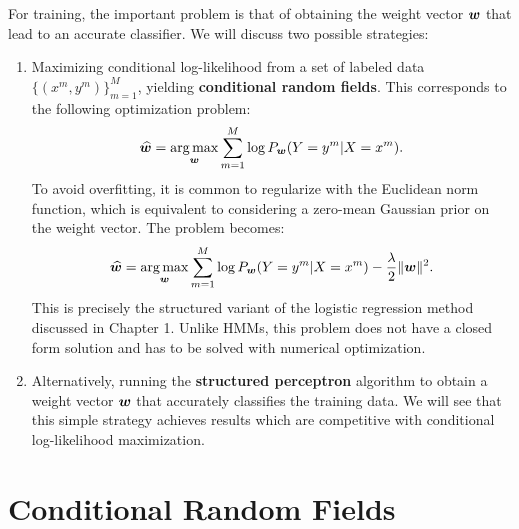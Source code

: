 For training, 
the important problem is that of obtaining the weight vector $\boldsymbol{w}$ that lead to an accurate 
classifier. 
We will discuss two possible strategies:
\begin{enumerate}
\item Maximizing conditional log-likelihood from a set of labeled data $\{(x^m,y^m)\}_{m=1}^M$, yielding \textbf{conditional random fields}. This corresponds to the following optimization problem:
\begin{equation}
\widehat{\boldsymbol{w}} = \operatorname*{arg\,max}_{\boldsymbol{w}} \sum_{m=1}^M \log P_{\boldsymbol{w}}(Y=y^m | X=x^m).
\end{equation}
To avoid overfitting, it is common to regularize with the Euclidean norm function, 
which is equivalent to considering a zero-mean Gaussian prior on the weight vector.
The problem becomes:
\begin{equation}
\widehat{\boldsymbol{w}} = \operatorname*{arg\,max}_{\boldsymbol{w}} \sum_{m=1}^M \log P_{\boldsymbol{w}}(Y=y^m | X=x^m) - \frac{\lambda}{2} \|\boldsymbol{w}\|^2.
\end{equation}
This is precisely the structured variant of the logistic regression 
method discussed in Chapter 1.
Unlike HMMs, this problem does not have a closed form solution 
and has to be solved with numerical optimization. 
\item Alternatively, running the \textbf{structured perceptron} algorithm 
to obtain a weight vector $\boldsymbol{w}$ that accurately
classifies the training data. 
We will see that this simple strategy achieves results which are competitive 
with conditional log-likelihood maximization.
\end{enumerate}




\section{\label{s:crf}Conditional Random Fields}

